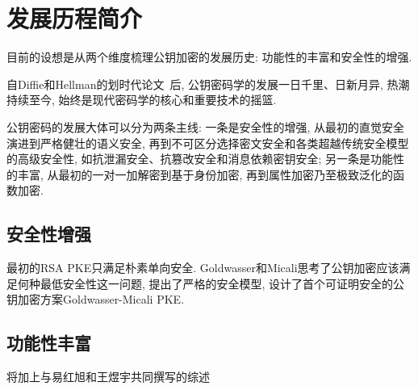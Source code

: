 \section{发展历程简介}
目前的设想是从两个维度梳理公钥加密的发展历史: 功能性的丰富和安全性的增强. 

自Diffie和Hellman的划时代论文~\cite{DH-IEEE-IT-1976}后, 
公钥密码学的发展一日千里、日新月异, 热潮持续至今, 始终是现代密码学的核心和重要技术的摇篮. 

公钥密码的发展大体可以分为两条主线: 一条是安全性的增强, 从最初的直觉安全演进到严格健壮的语义安全, 
再到不可区分选择密文安全和各类超越传统安全模型的高级安全性, 如抗泄漏安全、抗篡改安全和消息依赖密钥安全; 
另一条是功能性的丰富, 从最初的一对一加解密到基于身份加密, 再到属性加密乃至极致泛化的函数加密. 

\subsection{安全性增强}
最初的RSA PKE只满足朴素单向安全. 
Goldwasser和Micali思考了公钥加密应该满足何种最低安全性这一问题, 提出了严格的安全模型, 设计了首个可证明安全的公钥加密方案Goldwasser-Micali PKE. 



\subsection{功能性丰富}
将加上与易红旭和王煜宇共同撰写的综述